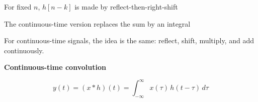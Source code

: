 \documentclass[aspectratio=169,11pt]{beamer}
\newcommand{\CardTitleSize}{\large}
\newcommand{\CardTitle}[1]{%
  \vspace{0.15cm}
  {\CardTitleSize\bfseries #1}\par
}
\begin{document}
\begin{frame}{For fixed \(n\), \(h[n-k]\) is made by reflect-then-right-shift}
\begin{center}
\begin{OrangeCard}[
  width=0.94\textwidth,
  halign=center,
  top=9pt,
  bottom=9pt
]

\end{OrangeCard}
\end{center}

\end{frame}



\begin{frame}{The continuous-time version replaces the sum by an integral}

\begin{BlueBox}[
  calloutshadedblue,
  fontupper=\large,
  halign=center
]{}
For continuous-time signals, the idea is the same:  
reflect, shift, multiply, and add continuously.
\end{BlueBox}

\vspace{0.12cm}

\begin{center}
\begin{GreenCard}[
  width=0.90\textwidth,
  halign=center,
  top=12pt,
  bottom=12pt
]
\CardTitle{Continuous-time convolution}

\vspace{0.08cm}

{\Large
\[
\boxed{\displaystyle
y(t)=(x*h)(t)=\int_{-\infty}^{\infty}x(\tau)\,h(t-\tau)\,d\tau
}
\]
}






\end{GreenCard}
\end{center}

\end{frame}
\end{document}
